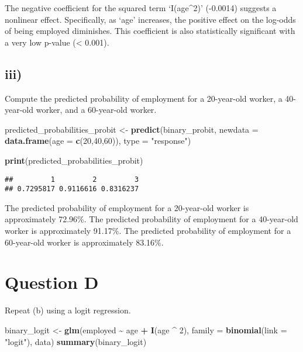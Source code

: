 \documentclass[
]{article}
\newenvironment{Shaded}{\begin{snugshade}}{\end{snugshade}}
\newcommand{\AttributeTok}[1]{\textcolor[rgb]{0.13,0.29,0.53}{#1}}
\newcommand{\DecValTok}[1]{\textcolor[rgb]{0.00,0.00,0.81}{#1}}
\newcommand{\FunctionTok}[1]{\textcolor[rgb]{0.13,0.29,0.53}{\textbf{#1}}}
\newcommand{\NormalTok}[1]{#1}
\newcommand{\OtherTok}[1]{\textcolor[rgb]{0.56,0.35,0.01}{#1}}
\newcommand{\SpecialCharTok}[1]{\textcolor[rgb]{0.81,0.36,0.00}{\textbf{#1}}}
\newcommand{\StringTok}[1]{\textcolor[rgb]{0.31,0.60,0.02}{#1}}
\begin{document}
The negative coefficient for the squared term `I(age\^{}2)' (-0.0014)
suggests a nonlinear effect. Specifically, as `age' increases, the
positive effect on the log-odds of being employed diminishes. This
coefficient is also statistically significant with a very low p-value
(\textless{} 0.001).

\hypertarget{iii-1}{%
\subsection{iii)}\label{iii-1}}

Compute the predicted probability of employment for a 20-year-old
worker, a 40-year-old worker, and a 60-year-old worker.

\begin{Shaded}
\begin{Highlighting}[]
\NormalTok{predicted\_probabilities\_probit }\OtherTok{\textless{}{-}} \FunctionTok{predict}\NormalTok{(binary\_probit,}
                                          \AttributeTok{newdata =} \FunctionTok{data.frame}\NormalTok{(}\AttributeTok{age =} \FunctionTok{c}\NormalTok{(}\DecValTok{20}\NormalTok{,}\DecValTok{40}\NormalTok{,}\DecValTok{60}\NormalTok{)),}
                                          \AttributeTok{type =} \StringTok{"response"}\NormalTok{)}

\FunctionTok{print}\NormalTok{(predicted\_probabilities\_probit)}
\end{Highlighting}
\end{Shaded}

\begin{verbatim}
##         1         2         3 
## 0.7295817 0.9116616 0.8316237
\end{verbatim}

The predicted probability of employment for a 20-year-old worker is
approximately 72.96\%. The predicted probability of employment for a
40-year-old worker is approximately 91.17\%. The predicted probability
of employment for a 60-year-old worker is approximately 83.16\%.

\hypertarget{question-d}{%
\section{Question D}\label{question-d}}

Repeat (b) using a logit regression.

\begin{Shaded}
\begin{Highlighting}[]
\NormalTok{binary\_logit }\OtherTok{\textless{}{-}} \FunctionTok{glm}\NormalTok{(employed }\SpecialCharTok{\textasciitilde{}}\NormalTok{ age }\SpecialCharTok{+} \FunctionTok{I}\NormalTok{(age }\SpecialCharTok{\^{}} \DecValTok{2}\NormalTok{), }
                    \AttributeTok{family =} \FunctionTok{binomial}\NormalTok{(}\AttributeTok{link =} \StringTok{"logit"}\NormalTok{), }
\NormalTok{                    data)}
\FunctionTok{summary}\NormalTok{(binary\_logit)}
\end{Highlighting}
\end{Shaded}
\end{document}
